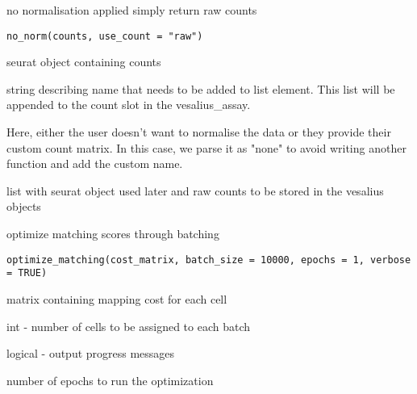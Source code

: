 \documentclass[a4paper]{book}
\begin{document}
%
\begin{Description}
no normalisation applied simply return raw counts
\end{Description}
%
\begin{Usage}
\begin{verbatim}
no_norm(counts, use_count = "raw")
\end{verbatim}
\end{Usage}
%
\begin{Arguments}
\begin{ldescription}
\item[\code{counts}] seurat object containing counts

\item[\code{use\_count}] string describing name that needs to be added to
list element. This list will be appended to the count slot in
the vesalius\_assay.
\end{ldescription}
\end{Arguments}
%
\begin{Details}
Here, either the user doesn't want to normalise the data or
they provide their custom count matrix. In this case, we parse it 
as "none" to avoid writing another function and add the custom name.
\end{Details}
%
\begin{Value}
list with seurat object used later and raw counts to be stored in
the vesalius objects
\end{Value}
%
\begin{Description}
optimize matching scores through batching
\end{Description}
%
\begin{Usage}
\begin{verbatim}
optimize_matching(cost_matrix, batch_size = 10000, epochs = 1, verbose = TRUE)
\end{verbatim}
\end{Usage}
%
\begin{Arguments}
\begin{ldescription}
\item[\code{cost\_matrix}] matrix containing mapping cost for each cell

\item[\code{batch\_size}] int - number of cells to be assigned to each batch

\item[\code{verbose}] logical - output progress messages

\item[\code{epoch}] number of epochs to run the optimization
\end{ldescription}
\end{Arguments}
\end{document}
